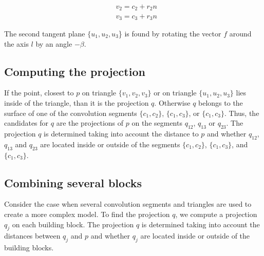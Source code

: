 \begin{align}
	& v_2 = c_2  + r_2 n \\
	& v_3 = c_3 + r_3 n 
\end{align}

The second tangent plane $\{u_1, u_2, u_3$\} is found by rotating the vector $f$ around the axis $l$ by an angle $-\beta$.



\subsection{Computing the projection}

If the point, closest to $p$ on triangle $\{v_1, v_2, v_3\}$ or on triangle $\{u_1, u_2, u_3\}$ lies inside of the triangle, than it is the projection $q$. Otherwise $q$ belongs to the surface of one of the convolution segments $\{c_1, c_2\}$,  $\{c_1, c_3\}$, or  $\{c_1, c_3\}$. Thus, the candidates for $q$ are the projections of $p$ on the segments $q_{12}$, $q_{13}$ or $q_{23}$. The projection $q$ is determined taking into account the distance to $p$ and whether  $q_{12}$, $q_{13}$ and $q_{23}$ are located inside or outside of the segments $\{c_1, c_2\}$,  $\{c_1, c_3\}$, and  $\{c_1, c_3\}$.  


\subsection{Combining several blocks}

Consider the case when several convolution segments and triangles are used to create a more complex model. To find the projection $q$, we compute a projection $q_j$ on each  building block.  The projection $q$ is determined taking into account the distances between $q_j$ and $p$ and whether  $q_j$ are located inside or outside of the building blocks.

